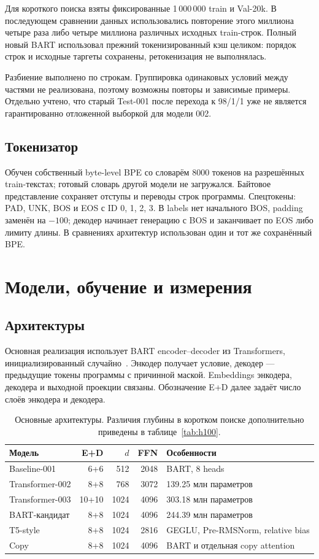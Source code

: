 Для короткого поиска взяты фиксированные 1\,000\,000 train и Val-20k.
В последующем сравнении данных использовались повторение этого миллиона
четыре раза либо четыре миллиона различных исходных train-строк.
Полный новый BART использовал прежний токенизированный кэш целиком:
порядок строк и исходные таргеты сохранены, ретокенизация не выполнялась.

Разбиение выполнено по строкам. Группировка одинаковых условий между
частями не реализована, поэтому возможны повторы и зависимые примеры.
Отдельно учтено, что старый Test-001 после перехода к 98/1/1 уже
не является гарантированно отложенной выборкой для модели 002.

\subsection{Токенизатор}
Обучен собственный byte-level BPE со словарём 8000 токенов на разрешённых
train-текстах; готовый словарь другой модели не загружался.
Байтовое представление сохраняет отступы и переводы строк программы.
Спецтокены: PAD, UNK, BOS и EOS с ID 0, 1, 2, 3.
В labels нет начального BOS, padding заменён на $-100$;
декодер начинает генерацию с BOS и заканчивает по EOS либо лимиту длины.
В сравнениях архитектур использован один и тот же сохранённый BPE.

\section{Модели, обучение и измерения}

\subsection{Архитектуры}
Основная реализация использует BART encoder--decoder из Transformers,
инициализированный случайно~\cite{bart}. Энкодер получает условие,
декодер --- предыдущие токены программы с причинной маской.
Embeddings энкодера, декодера и выходной проекции связаны.
Обозначение E+D далее задаёт число слоёв энкодера и декодера.

\begin{table}[htbp]
\centering\small
\begin{tabularx}{\linewidth}{lrrrX}
\toprule
Модель & E+D & $d$ & FFN & Особенности \\
\midrule
Baseline-001 & 6+6 & 512 & 2048 & BART, 8 heads \\
Transformer-002 & 8+8 & 768 & 3072 & 139.25 млн параметров \\
Transformer-003 & 10+10 & 1024 & 4096 & 303.18 млн параметров \\
BART-кандидат & 8+8 & 1024 & 4096 & 244.39 млн параметров \\
T5-style & 8+8 & 1024 & 2816 & GEGLU, Pre-RMSNorm, relative bias \\
Copy & 8+8 & 1024 & 4096 & BART и отдельная copy attention \\
\bottomrule
\end{tabularx}
\caption{Основные архитектуры. Различия глубины в коротком поиске
дополнительно приведены в таблице~\ref{tab:h100}.}
\end{table}

